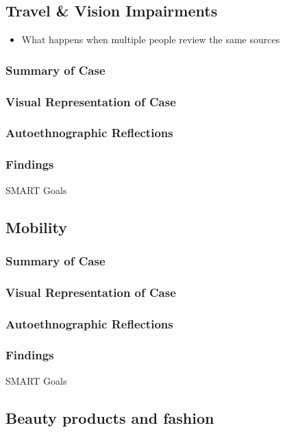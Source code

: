\subsection{Travel & Vision Impairments}
\begin{itemize}
\item What happens when multiple people review the same sources
\end{itemize}

\subsubsection{Summary of Case}

\subsubsection{Visual Representation of Case}

\subsubsection{Autoethnographic Reflections}

\subsubsection{Findings}
SMART Goals

\subsection{Mobility}
\subsubsection{Summary of Case}

\subsubsection{Visual Representation of Case}

\subsubsection{Autoethnographic Reflections}

\subsubsection{Findings}
SMART Goals

\subsection{Beauty products and fashion}
